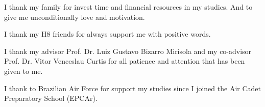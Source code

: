I thank my family for invest time and financial resources in my studies. And to give me unconditionally love and motivation.

I thank my H8 friends for always support me with positive words.

I thank my advisor Prof. Dr. Luiz Gustavo Bizarro Mirisola and my co-advisor Prof. Dr. Vitor Venceslau Curtis for all patience and attention that has been given to me.

I thank to Brazilian Air Force for support my studies since I joined the Air Cadet Preparatory School (EPCAr).
